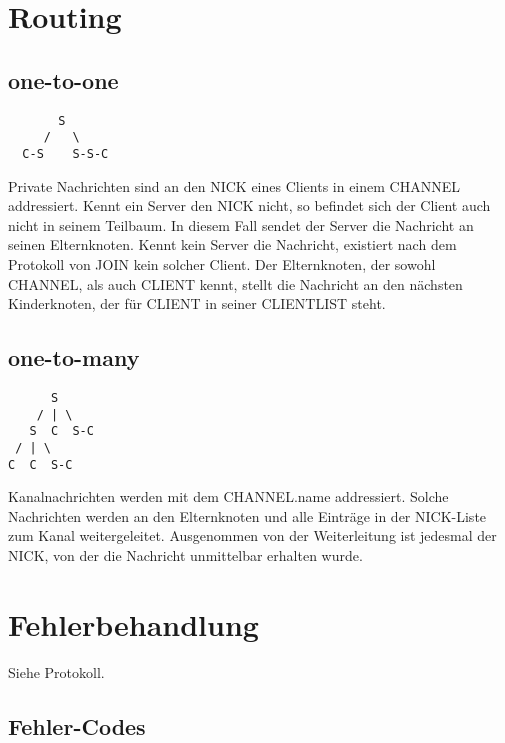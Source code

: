 \documentclass{article}
\begin{document}
\section{Routing}

\subsection{one-to-one}

\begin{lstlisting}
       S
     /   \
  C-S    S-S-C
\end{lstlisting}

Private Nachrichten sind an den NICK eines Clients in einem CHANNEL addressiert. Kennt ein Server den NICK nicht, so befindet sich der Client auch nicht in seinem Teilbaum. In diesem Fall sendet der Server die Nachricht an seinen Elternknoten. Kennt kein Server die Nachricht, existiert nach dem Protokoll von JOIN kein solcher Client. Der Elternknoten, der sowohl CHANNEL, als auch CLIENT kennt, stellt die Nachricht an den nächsten Kinderknoten, der für CLIENT in seiner CLIENTLIST steht.

\subsection{one-to-many}

\begin{lstlisting}
      S
    / | \
   S  C  S-C
 / | \
C  C  S-C
\end{lstlisting}

Kanalnachrichten werden mit dem CHANNEL.name addressiert. Solche Nachrichten werden an den Elternknoten und alle Einträge in der NICK-Liste zum Kanal weitergeleitet. Ausgenommen von der Weiterleitung ist jedesmal der NICK, von der die Nachricht unmittelbar erhalten wurde.


\section{Fehlerbehandlung}

Siehe Protokoll.

\subsection{Fehler-Codes}
\end{document}
